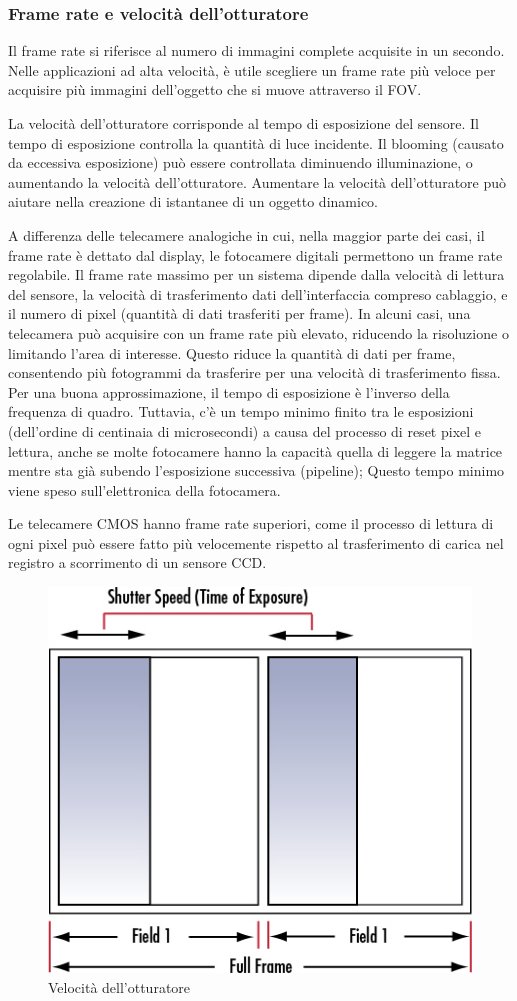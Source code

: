 \subsubsection{Frame rate e velocità dell'otturatore}
Il frame rate si riferisce al numero di immagini complete acquisite in un secondo.  Nelle applicazioni ad alta velocità, è utile scegliere un frame rate più veloce per acquisire più immagini dell'oggetto che si muove attraverso il FOV.

La velocità dell'otturatore corrisponde al tempo di esposizione del sensore. Il tempo di esposizione controlla la quantità di luce incidente. Il blooming (causato da eccessiva esposizione) può essere controllata diminuendo illuminazione, o aumentando la velocità dell'otturatore. Aumentare la velocità dell'otturatore può aiutare nella creazione di istantanee di un oggetto dinamico.

A differenza delle telecamere analogiche in cui, nella maggior parte dei casi, il frame rate è dettato dal display, le fotocamere digitali permettono un frame rate regolabile. Il frame rate massimo per un sistema dipende dalla velocità di lettura del sensore, la velocità di trasferimento dati dell'interfaccia compreso cablaggio, e il numero di pixel (quantità di dati trasferiti per frame). In alcuni casi, una telecamera può acquisire con un frame rate più elevato, riducendo la risoluzione o limitando l'area di interesse. Questo riduce la quantità di dati per frame, consentendo più fotogrammi da trasferire per una velocità di trasferimento fissa. Per una buona approssimazione, il tempo di esposizione è l'inverso della frequenza di quadro. Tuttavia, c'è un tempo minimo finito tra le esposizioni (dell'ordine di centinaia di microsecondi) a causa del processo di reset pixel e lettura, anche se molte fotocamere hanno la capacità quella di leggere la matrice mentre sta già subendo l'esposizione successiva (pipeline); 
Questo tempo minimo viene speso sull'elettronica della fotocamera.

Le telecamere CMOS hanno frame rate superiori, come il processo di lettura di ogni pixel può essere fatto più velocemente rispetto al trasferimento di carica nel registro a scorrimento di un sensore CCD.

\begin{figure}[!ht]
\centering
\includegraphics[width=.4\textwidth]{img/shutter-speed.jpeg}
\caption{Velocità dell'otturatore}
\label{fig:shutter-speed}
\end{figure}


